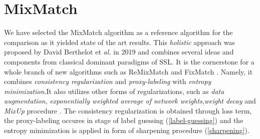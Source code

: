 \section{MixMatch}
\label{sec:mix-match}
We have selected the MixMatch algorithm as a reference algorithm for the comparison as it yielded state of the art results. This \textit{holistic} approach
was proposed by David Berthelot et \textit{al.} in 2019 \cite{mixmatch-2019} and combines several ideas and components from classical dominant paradigms of SSL.
It is the cornerstone for a whole branch of new algorithms such as ReMixMatch \cite{remixmatch-2020} and FixMatch \cite{fixmatch-2020}. Namely, it combines 
\textit{consistency regularization} and \textit{proxy-labeling} with \textit{entropy minimization}.It also utilizes other forms of regularizations, such as
\textit{data augmentation}, \textit{exponentially weighted average of network weights}\cite{mean-teacher-2018},\textit{weight decay} \cite{weight-decay-2019} and 
\textit{MixUp} procedure \cite{mixup-2018}. The consistency regularization is obtained through loss term, the proxy-labeling occures in stage of label guessing 
(\ref{label-guessing}) and the entropy minimization is applied in form of sharpening procedure (\ref{sharpening}).

